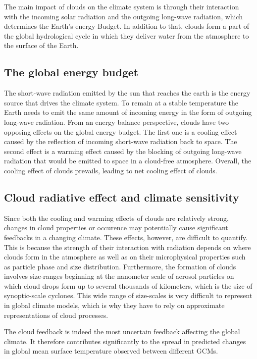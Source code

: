 The main impact of clouds on the climate system is through their interaction
with the incoming solar radiation and the outgoing long-wave radiation, which
determines the Earth's energy Budget. In addition to that, clouds form a part
of the global hydrological cycle in which they deliver water from the atmosphere
to the surface of the Earth.

\subsection{The global energy budget}

The short-wave radiation emitted by the sun that reaches the earth is the energy
source that drives the climate system. To remain at a stable temperature the
Earth needs to emit the same amount of incoming energy in the form of outgoing
long-wave radiation. From an energy balance perspective, clouds have two
opposing effects on the global energy budget. The first one is a cooling effect
caused by the reflection of incoming short-wave radiation back to space. The
second effect is a warming effect caused by the blocking of outgoing long-wave
radiation that would be emitted to space in a cloud-free atmosphere. Overall,
the cooling effect of clouds prevails, leading to net cooling effect of clouds.

\subsection{Cloud radiative effect and climate sensitivity}

Since both the cooling and warming effects of clouds are relatively strong,
changes in cloud properties or occurence may potentially cause significant
feedbacks in a changing climate. These effects, however, are difficult to
quantify. This is because the strength of their interaction with radiation
depends on where clouds form in the atmosphere as well as on their microphysical
properties such as particle phase and size distribution. Furthermore, the
formation of clouds involves size-ranges beginning at the nanometer scale of
aerosol particles on which cloud drops form up to several thousands of
kilometers, which is the size of synoptic-scale cyclones. This wide range of
size-scales is very difficult to represent in global climate models, which is
why they have to rely on approximate representations of cloud processes.

The cloud feedback is indeed the most uncertain feedback affecting the global
climate. It therefore contributes significantly to the spread in predicted
changes in global mean surface temperature observed between different GCMs.

